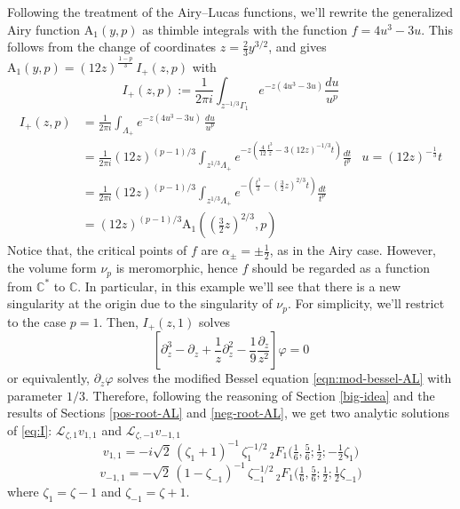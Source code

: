 \documentclass{article}
\theoremstyle{definition}
\newcommand{\C}{\mathbb{C}}
\newcommand{\laplace}{\mathcal{L}}
\theoremstyle{plain}
\newenvironment{verify}{\color{ForestGreen}}{\color{black}}
\begin{document}
Following the treatment of the Airy--Lucas functions, we'll rewrite the generalized Airy function $\mathrm{A}_1(y,p)$ as thimble integrals with the function $f=4u^3-3u$. This follows from the change of coordinates $z=\tfrac{2}{3}y^{3/2}$, and gives $\mathrm{A}_1(y,p) = (12 z)^{\tfrac{1-p}{3}}\, I_+(z,p)$ with 
%
\[I_+(z,p):=\frac{1}{2\pi i}\int_{z^{-1/3}\Gamma_1} e^{-z(4u^3-3u)} \frac{du}{u^p}\]
%
\begin{verify}
  \begin{align*}
I_{+}(z,p)&=\frac{1}{2\pi i}\int_{\Lambda_{+}}e^{-z(4u^3-3u)}\, \frac{du}{u^p} &\\
&=\frac{1}{2\pi i}(12 z)^{(p-1)/3}\int_{z^{1/3}\Lambda_{+}}e^{-z(\tfrac{4}{12}\tfrac{t^3}{z}-3 (12 z)^{-1/3}t)}\frac{dt}{t^p} & u=(12 z)^{-\tfrac{1}{3}}t\\
&=\frac{1}{2\pi i}(12 z)^{(p-1)/3}\int_{z^{1/3}\Lambda_{+}}e^{-\left(\frac{t^3}{3}-(\tfrac{3}{2} z)^{2/3}t\right)}\frac{dt}{t^p} & \\
&=(12 z)^{(p-1)/3}\mathrm{A}_1((\tfrac{3}{2}z)^{2/3},p)
\end{align*}  
\end{verify}
%
Notice that, the critical points of $f$ are $\alpha_{\pm}=\pm\tfrac{1}{2}$, as in the Airy case. However, the volume form $\nu_p$ is meromorphic, hence $f$ should be regarded as a function from $\C^*$ to $\C$. In particular, in this example we'll see that there is a new singularity at the origin due to the singularity of $\nu_p$. For simplicity, we'll restrict to the case $p=1$. Then, $I_+(z,1)$ solves
\begin{equation}\label{eq:I}
\left[\partial_z^3-\partial_z+\frac{1}{z}\partial_z^2-\frac{1}{9}\frac{\partial_z}{z^2}\right]\varphi=0
\end{equation}
or equivalently, $\partial_z\varphi$ solves the modified Bessel equation \eqref{eqn:mod-bessel-AL} with parameter $1/3$. Therefore, following the reasoning of Section \ref{big-idea} and the results of Sections \ref{pos-root-AL} and \ref{neg-root-AL}, we get two analytic solutions of \eqref{eq:I}: $\laplace_{\zeta,1}v_{1,1}$ and $\laplace_{\zeta,-1}v_{-1,1}$ 
\[ v_{1,1}=-i\sqrt{2}\, (\zeta_1+1)^{-1}\, \zeta_1^{-1/2}\, {}_2F_1\Big(\tfrac{1}{6},\tfrac{5}{6};\tfrac{1}{2};-\tfrac{1}{2}\zeta_{1}\Big)\]
\[ v_{-1,1}=-\sqrt{2}\, (1-\zeta_{-1})^{-1}\, \zeta_{-1}^{-1/2}\, {}_2F_1\Big(\tfrac{1}{6},\tfrac{5}{6};\tfrac{1}{2};\tfrac{1}{2}\zeta_{-1}\Big)\]
where $\zeta_1=\zeta-1$ and $\zeta_{-1}=\zeta+1$. 
\end{document}
